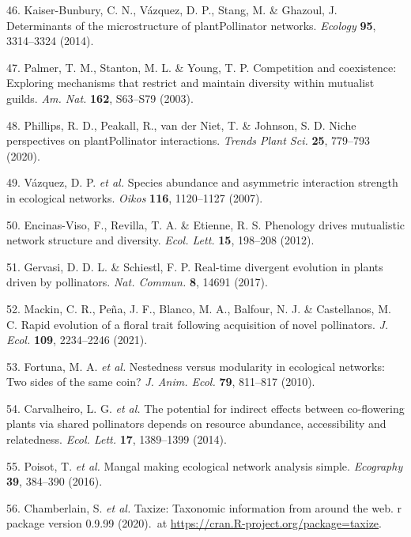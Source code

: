 \documentclass[12pt,a4paper,]{article}
\begin{document}
\hypertarget{ref-kaiser2014}{}
46. Kaiser-Bunbury, C. N., Vázquez, D. P., Stang, M. \& Ghazoul, J.
Determinants of the microstructure of plantPollinator networks.
\emph{Ecology} \textbf{95}, 3314--3324 (2014).

\hypertarget{ref-palmer2003}{}
47. Palmer, T. M., Stanton, M. L. \& Young, T. P. Competition and
coexistence: Exploring mechanisms that restrict and maintain diversity
within mutualist guilds. \emph{Am. Nat.} \textbf{162}, S63--S79 (2003).

\hypertarget{ref-phillips2020}{}
48. Phillips, R. D., Peakall, R., van der Niet, T. \& Johnson, S. D.
Niche perspectives on plantPollinator interactions. \emph{Trends Plant
Sci.} \textbf{25}, 779--793 (2020).

\hypertarget{ref-vazquez2007}{}
49. Vázquez, D. P. \emph{et al.} Species abundance and asymmetric
interaction strength in ecological networks. \emph{Oikos} \textbf{116},
1120--1127 (2007).

\hypertarget{ref-encinas2012}{}
50. Encinas-Viso, F., Revilla, T. A. \& Etienne, R. S. Phenology drives
mutualistic network structure and diversity. \emph{Ecol. Lett.}
\textbf{15}, 198--208 (2012).

\hypertarget{ref-gervasi2017}{}
51. Gervasi, D. D. L. \& Schiestl, F. P. Real-time divergent evolution
in plants driven by pollinators. \emph{Nat. Commun.} \textbf{8}, 14691
(2017).

\hypertarget{ref-mackin2021}{}
52. Mackin, C. R., Peña, J. F., Blanco, M. A., Balfour, N. J. \&
Castellanos, M. C. Rapid evolution of a floral trait following
acquisition of novel pollinators. \emph{J. Ecol.} \textbf{109},
2234--2246 (2021).

\hypertarget{ref-fortuna2010}{}
53. Fortuna, M. A. \emph{et al.} Nestedness versus modularity in
ecological networks: Two sides of the same coin? \emph{J. Anim. Ecol.}
\textbf{79}, 811--817 (2010).

\hypertarget{ref-carvalheiro2014}{}
54. Carvalheiro, L. G. \emph{et al.} The potential for indirect effects
between co-flowering plants via shared pollinators depends on resource
abundance, accessibility and relatedness. \emph{Ecol. Lett.}
\textbf{17}, 1389--1399 (2014).

\hypertarget{ref-poisot2016}{}
55. Poisot, T. \emph{et al.} Mangal making ecological network analysis
simple. \emph{Ecography} \textbf{39}, 384--390 (2016).

\hypertarget{ref-chamberlain2020}{}
56. Chamberlain, S. \emph{et al.} Taxize: Taxonomic information from
around the web. r package version 0.9.99 (2020).~at
\href{https://CRAN.R-project.org/package=taxize}{https://cran.R-project.org/package=taxize}.
\end{document}

